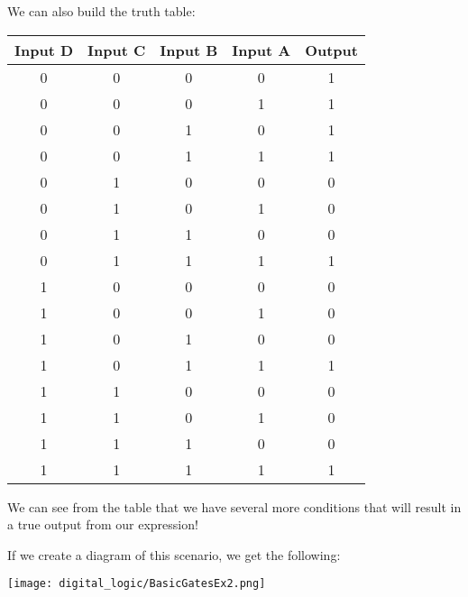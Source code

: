 \begin{example}
        We can also build the truth table:
        \begin{center}
            \begin{tabular}{c c c c | c}
                \toprule
                Input D & Input C & Input B & Input A & Output \\
                \midrule
                    0    &    0     &    0     &    0     &    1    \\
                    0    &    0     &    0     &    1     &    1    \\
                    0    &    0     &    1     &    0     &    1    \\
                    0    &    0     &    1     &    1     &    1    \\
                    0    &    1     &    0     &    0     &    0    \\
                    0    &    1     &    0     &    1     &    0    \\
                    0    &    1     &    1     &    0     &    0    \\
                    0    &    1     &    1     &    1     &    1    \\
                    1    &    0     &    0     &    0     &    0    \\
                    1    &    0     &    0     &    1     &    0    \\
                    1    &    0     &    1     &    0     &    0    \\
                    1    &    0     &    1     &    1     &    1    \\
                    1    &    1     &    0     &    0     &    0    \\
                    1    &    1     &    0     &    1     &    0    \\
                    1    &    1     &    1     &    0     &    0    \\
                    1    &    1     &    1     &    1     &    1    \\
                \bottomrule
            \end{tabular}
        \end{center}
        We can see from the table that we have several more conditions that will result in a true output from our expression!

        If we create a diagram of this scenario, we get the following:
        \begin{center}
            \texttt{[image: digital\_logic/BasicGatesEx2.png]}
        \end{center}
    \end{example}


